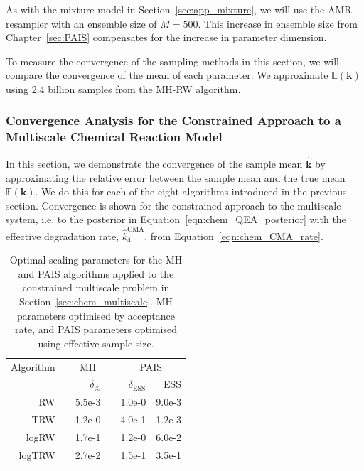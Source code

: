 \documentclass[final]{siamltex}
\begin{document}
As with the mixture model in Section~\ref{sec:app_mixture}, we will use the AMR resampler with an ensemble size of $M=500$. This increase in ensemble size from Chapter~\ref{sec:PAIS} compensates for the increase in parameter dimension.

To measure the convergence of the sampling methods in this section, we will compare the convergence of the mean of each parameter. We approximate $\mathbb{E}(\mathbf{k})$ using 2.4 billion samples from the MH-RW algorithm.

\subsubsection{Convergence Analysis for the Constrained Approach to a Multiscale Chemical Reaction Model}\label{sec:chem_conv}

In this section, we demonstrate the convergence of the sample mean $\hat{\mathbf{k}}$ by approximating the relative error between the sample mean and the true mean $\mathbb{E}(\mathbf{k})$. We do this for each of the eight algorithms introduced in the previous section. Convergence is shown for the constrained approach to the multiscale system, i.e. to the posterior in Equation~\eqref{eqn:chem_QEA_posterior} with the effective degradation rate, $\hat{k}_4^{\text{CMA}}$, from Equation~\eqref{eqn:chem_CMA_rate}.

\begin{table}[!h]
\centering
\begin{tabular}{rrrrrr}
\toprule
	\multicolumn{1}{l}{Algorithm} & \multicolumn{3}{c}{MH} & \multicolumn{2}{c}{PAIS} \\ \cmidrule(lr){2-4} \cmidrule(lr){5-6}
	& & $\delta_\%$ & & $\delta_{\text{ESS}}$ & ESS \\ \midrule
	RW & & 5.5e-3 & & 1.0e-0 & 9.0e-3 \\
	TRW & & 1.2e-0 & & 4.0e-1 & 1.2e-3 \\
	logRW & & 1.7e-1 & & 1.2e-0 & 6.0e-2 \\
	logTRW & & 2.7e-2 & & 1.5e-1 & 3.5e-1 \\
\bottomrule
\end{tabular}
\caption{Optimal scaling parameters for the MH and PAIS algorithms applied to the constrained multiscale problem in Section~\ref{sec:chem_multiscale}. MH parameters optimised by acceptance rate, and PAIS parameters optimised using effective sample size.}
\label{tab:chem_multiscale_scaling}
\end{table}
\end{document}
